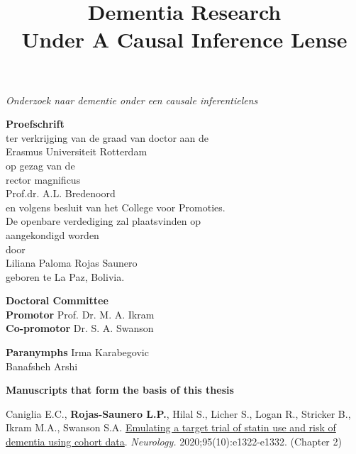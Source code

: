 \thispagestyle{empty}
\begin{center}
\vspace{20mm}

\title{\textbf{\Large Dementia Research \\ Under A Causal Inference Lense}}

\textit{\large Onderzoek naar dementie onder een causale inferentielens}

\vspace{10mm}
\textbf{\large{Proefschrift}}\\
\vspace{10mm}
ter verkrijging van de graad van doctor aan de\\
Erasmus Universiteit Rotterdam\\
op gezag van de\\
rector magnificus\\
\vspace{10mm}
Prof.dr. A.L. Bredenoord\\
\vspace{10mm}
en volgens besluit van het College voor Promoties.\\
De openbare verdediging zal plaatsvinden op\\
aangekondigd worden\\
\vspace{10mm}
door\\
\vspace{10mm}
Liliana Paloma Rojas Saunero\\
geboren te La Paz, Bolivia. 
\end{center}


 

\newpage
\thispagestyle{empty}
\textbf{Doctoral Committee} \\
\textbf{Promotor}\phantom{mbersa:}     Prof. Dr. M. A. Ikram   \\ 
\textbf{Co-promotor} \phantom{er::} Dr. S. A. Swanson  

\vspace*{\fill}
 
\textbf{Paranymphs }    Irma Karabegovic   \\ 
\phantom{Paranymphs ab} Banafsheh Arshi    
                    
\newpage  
\thispagestyle{empty}
\textbf{Manuscripts that form the basis of this thesis}

Caniglia E.C., \textbf{Rojas-Saunero L.P.}, Hilal S., Licher S., Logan
R., Stricker B., Ikram M.A., Swanson S.A.
\href{https://pubmed.ncbi.nlm.nih.gov/32753444/}{Emulating a target
trial of statin use and risk of dementia using cohort data}.
\emph{Neurology.} 2020;95(10):e1322-e1332. (Chapter 2)

